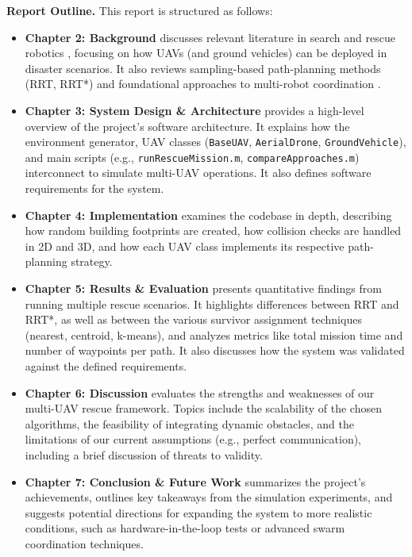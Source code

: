 \documentclass[12pt,a4paper]{report}
\begin{document}
\bigskip

\noindent \textbf{Report Outline.} This report is structured as follows:
\begin{itemize}
    \item \textbf{Chapter 2: Background} discusses relevant literature in search 
          and rescue robotics \cite{Daud2022DroneDisaster,Erdelj2017MultiUAV}, focusing on how UAVs (and ground vehicles) can be 
          deployed in disaster scenarios. It also reviews sampling-based path-planning 
          methods (RRT, RRT*) \cite{Orthey2024SBMPReview,LaValle2001RRT,Karaman2011RRTstar} and foundational approaches to multi-robot coordination \cite{Gerkey2004Taxonomy}.
          
    \item \textbf{Chapter 3: System Design \& Architecture} provides a high-level 
          overview of the project’s software architecture. It explains how the 
          environment generator, UAV classes (\texttt{BaseUAV}, \texttt{AerialDrone}, 
          \texttt{GroundVehicle}), and main scripts (e.g., \texttt{runRescueMission.m}, 
          \texttt{compareApproaches.m}) interconnect to simulate multi-UAV operations. 
          It also defines software requirements for the system.

    \item \textbf{Chapter 4: Implementation} examines the codebase in depth,
          describing how random building footprints are created, how collision checks 
          are handled in 2D and 3D, and how each UAV class implements its respective 
          path-planning strategy. 

    \item \textbf{Chapter 5: Results \& Evaluation} presents quantitative findings 
          from running multiple rescue scenarios. It highlights differences between 
          RRT and RRT*, as well as between the various survivor assignment techniques 
          (nearest, centroid, k-means), and analyzes metrics like total mission time 
          and number of waypoints per path. It also discusses how the system was 
          validated against the defined requirements.

    \item \textbf{Chapter 6: Discussion} evaluates the strengths and weaknesses of 
          our multi-UAV rescue framework. Topics include the scalability of the chosen 
          algorithms, the feasibility of integrating dynamic obstacles, and the 
          limitations of our current assumptions (e.g., perfect communication), 
          including a brief discussion of threats to validity.

    \item \textbf{Chapter 7: Conclusion \& Future Work} summarizes the project’s 
          achievements, outlines key takeaways from the simulation experiments, 
          and suggests potential directions for expanding the system to more 
          realistic conditions, such as hardware-in-the-loop tests or advanced 
          swarm coordination techniques.
\end{itemize}
\end{document}
